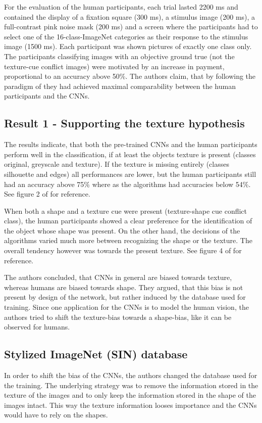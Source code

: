 \documentclass[runningheads,a4paper]{llncs}
\begin{document}
For the evaluation of the human participants, each trial lasted 2200 ms and contained the display of a fixation square (300 ms), a stimulus image (200 ms), a full-contrast pink noise mask (200 ms) and a screen where the participants had to select one of the 16-class-ImageNet categories as their response to the stimulus image (1500 ms). Each participant was shown pictures of exactly one class only. The participants classifying images with an objective ground true (not the texture-cue conflict images) were motivated by an increase in payment, proportional to an accuracy above 50\%. The authors claim, that by following the paradigm of \citet{geirhos2018generalisation} they had achieved maximal comparability between the human participants and the CNNs.

\subsection{Result 1 - Supporting the texture hypothesis}%
The results indicate, that both the pre-trained CNNs and the human participants perform well in the classification, if at least the objects texture is present (classes original, greyscale and texture). If the texture is missing entirely (classes silhouette and edges) all performances are lower, but the human participants still had an accuracy above 75\% where as the algorithms had accuracies below 54\%. See figure 2 of \citet{geirhos2018imagenet} for reference.

When both a shape and a texture cue were present (texture-shape cue conflict class), the human participants showed a clear preference for the identification of the object whose shape was present. On the other hand, the decisions of the algorithms varied much more between recognizing the shape or the texture. The overall tendency however was towards the present texture. See figure 4 of \citet{geirhos2018imagenet} for reference.

The authors concluded, that CNNs in general are biased towards texture, whereas humans are biased towards shape. They argued, that this bias is not present by design of the network, but rather induced by the database used for training. Since one application for the CNNs is to model the human vision, the authors tried to shift the texture-bias towards a shape-bias, like it can be observed for humans.

\subsection{Stylized ImageNet (SIN) database}
In order to shift the bias of the CNNs, the authors changed the database used for the training. The underlying strategy was to remove the information stored in the texture of the images and to only keep the information stored in the shape of the images intact. This way the texture information looses importance and the CNNs would have to rely on the shapes.
\end{document}
